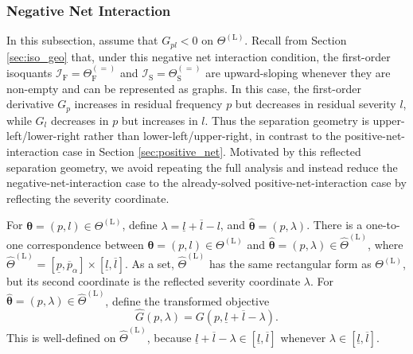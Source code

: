 \documentclass[a4paper,12pt]{article}
\begin{document}
\subsubsection{Negative Net Interaction}\label{sec:negative_net}

In this subsection, assume that $G_{pl}<0$ on $\Theta^{\left(\text{L}\right)}$. Recall from Section \ref{sec:iso_geo} that, under this negative net interaction condition, the first-order isoquants $\mathcal{I}_{\text{F}}=\Theta_{\text{F}}^{\left(=\right)}$ and $\mathcal{I}_{\text{S}}=\Theta_{\text{S}}^{\left(=\right)}$ are upward-sloping whenever they are non-empty and can be represented as graphs. In this case, the first-order derivative $G_p$ increases in residual frequency $p$ but decreases in residual severity $l$, while $G_l$ decreases in $p$ but increases in $l$. Thus the separation geometry is upper-left/lower-right rather than lower-left/upper-right, in contrast to the positive-net-interaction case in Section \ref{sec:positive_net}. Motivated by this reflected separation geometry, we avoid repeating the full analysis and instead reduce the negative-net-interaction case to the already-solved positive-net-interaction case by reflecting the severity coordinate.

For ${\bm\theta}=\left(p,l\right)\in\Theta^{\left(\text{L}\right)}$, define $\lambda=\underline{l}+\overline{l}-l$, and $\hat{{\bm\theta}}=\left(p,\lambda\right)$. There is a one-to-one correspondence between ${\bm\theta}=\left(p,l\right)\in\Theta^{\left(\text{L}\right)}$ and $\hat{{\bm\theta}}=\left(p,\lambda\right)\in\hat{\Theta}^{\left(\text{L}\right)}$, where $\hat{\Theta}^{\left(\text{L}\right)}=\left[\underline{p},\overline{p}_{\alpha}\right]\times\left[\underline{l},\overline{l}\right]$. As a set, $\hat{\Theta}^{\left(\text{L}\right)}$ has the same rectangular form as $\Theta^{\left(\text{L}\right)}$, but its second coordinate is the reflected severity coordinate $\lambda$. For $\hat{{\bm\theta}}=\left(p,\lambda\right)\in\hat{\Theta}^{\left(\text{L}\right)}$, define the transformed objective
\begin{equation*}
\hat{G}\left(p,\lambda\right)=G\left(p,\underline{l}+\overline{l}-\lambda\right).
\end{equation*}
This is well-defined on $\hat{\Theta}^{\left(\text{L}\right)}$, because $\underline{l}+\overline{l}-\lambda\in\left[\underline{l},\overline{l}\right]$ whenever $\lambda\in\left[\underline{l},\overline{l}\right]$.
\end{document}
